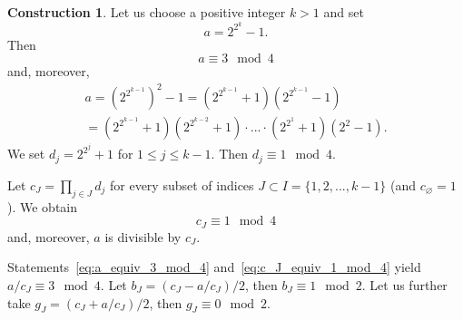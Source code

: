 \documentclass[a4paper,14pt]{article} %
\theoremstyle{plain}
\theoremstyle{definition}
\newtheorem{construction}[theorem]{Construction}
\begin{document}
\begin{construction}
	\label{con:planar_set_with_minimeter_1}
	Let us choose a positive integer $k > 1$ and set
	\begin{equation}
		a = 2^{2^k} - 1
		.
	\end{equation}
	Then
	\begin{equation}
		\label{eq:a_equiv_3_mod_4}
		a \equiv 3 \mod 4
	\end{equation}
	and, moreover,
	\begin{multline}
		a = \left(2^{2^{k-1}}\right)^2 - 1
		=
		\left(2^{2^{k-1}} + 1\right) \left(2^{2^{k-1}} - 1\right)
		\\=
		\left(2^{2^{k-1}} + 1\right) \left(2^{2^{k-2}} + 1\right) \cdot ... \cdot \left(2^{2^1} + 1\right) \left(2^2 - 1\right)
		.
	\end{multline}
	We set $d_j = 2^{2^j} + 1$ for $1 \leq j \leq k-1$.
	Then $d_j \equiv 1 \mod 4$.

	Let $c_J = \prod_{j\in J} d_j$ for every subset of indices $J\subset I = \{1,2,...,k-1\}$
	(and  $c_\varnothing = 1$).
	We obtain
	\begin{equation}
		\label{eq:c_J_equiv_1_mod_4}
		c_J\equiv 1 \mod{4}
	\end{equation}
	and, moreover, $a$ is divisible by $c_J$.


	Statements~\eqref{eq:a_equiv_3_mod_4} and~\eqref{eq:c_J_equiv_1_mod_4} yield $a/c_J \equiv 3 \mod 4$.
	Let $b_J = (c_J - a/c_J)/2$, then $b_J \equiv 1 \mod 2$.
	Let us further take $g_J = (c_J + a/c_J)/2$, then $g_J \equiv 0 \mod 2$.


\end{construction}
\end{document}
